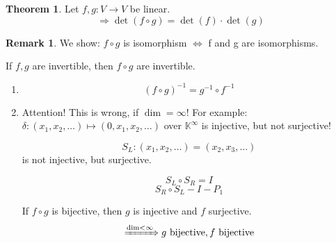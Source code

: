 \documentclass[a4paper,landscape,twocolumn]{article}
\theoremstyle{definition}
\newtheorem{theorem}{Theorem}
\newtheorem{rem}{Remark}
\begin{document}
\begin{theorem}
  \label{theorem-7.29}
  Let $f,g: V \to V$ be linear.
  \[ \Rightarrow \det(f \circ g) = \det(f) \cdot \det(g) \]
\end{theorem}
\begin{rem}
  We show: $f \circ g$ is isomorphism $\Leftrightarrow$ f and g are isomorphisms.

  If $f,g$ are invertible, then $f \circ g$ are invertible.
  \begin{enumerate}
    \item
      \[ (f \circ g)^{-1} = g^{-1} \circ f^{-1} \]
    \item
      Attention! This is wrong, if $\dim = \infty$!
      For example: $\delta: (x_1, x_2, \ldots) \mapsto (0, x_1, x_2, \ldots)$ over $\mathbb K^\infty$
      is injective, but not surjective!

      \[ S_L: (x_1, x_2, \ldots) = (x_2, x_3, \ldots) \]
      is not injective, but surjective.

      \[ S_L \circ S_R = I \]
      \[ S_R \circ S_L - I - P_1 \]

      If $f \circ g$ is bijective, then $g$ is injective and $f$ surjective.
      \[ \xRightarrow{\dim < \infty} g \text{ bijective}, f \text{ bijective} \]
  \end{enumerate}
\end{rem}
\end{document}
